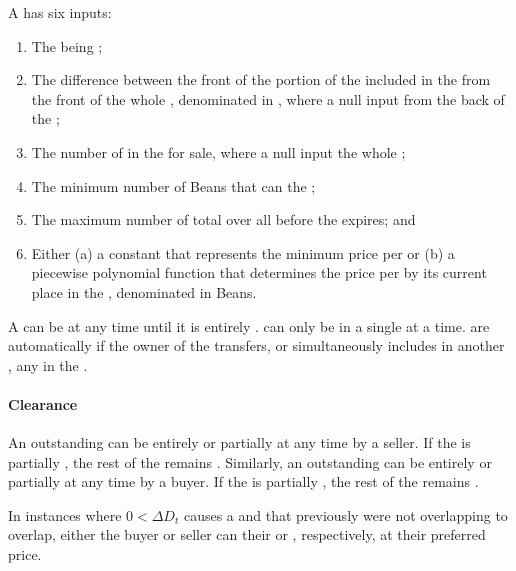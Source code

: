 \documentclass[class=article, crop=false]{standalone}
\begin{document}
A  has six inputs: 
\begin{enumerate}
        \item The  being ;
        \item The difference between the front of the portion of the  included in the  from the front of the whole , denominated in , where a null input  from the back of the ;
        \item The number of  in the  for sale, where a null input  the whole ;
        \item The minimum number of Beans that can  the ; 
        \item The maximum number of total   over all  before the  expires; and
        \item Either (a) a constant that represents the minimum price per  or (b) a piecewise polynomial function that determines the price per  by its current place in the , denominated in Beans.
\end{enumerate}

A  can be  at any time until it is entirely .  can only be  in a single  at a time.  are automatically  if the owner of the  transfers, or simultaneously includes in another , any  in the .

\paragraph{Clearance}

An outstanding  can be entirely or partially  at any time by a  seller. If the  is partially , the rest of the  remains . Similarly, an outstanding  can be entirely or partially  at any time by a  buyer. If the  is partially , the rest of the  remains .

In instances where $0 < \Delta D_t$ causes a  and  that previously were not overlapping to overlap, either the buyer or seller can  their  or , respectively, at their preferred price. 
\end{document}
